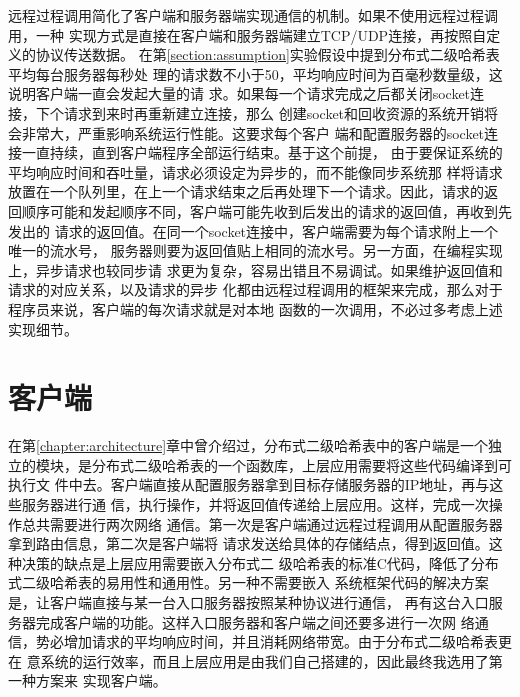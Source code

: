 远程过程调用简化了客户端和服务器端实现通信的机制。如果不使用远程过程调用，一种
实现方式是直接在客户端和服务器端建立TCP/UDP连接，再按照自定义的协议传送数据。
在第\ref{section:assumption}实验假设中提到分布式二级哈希表平均每台服务器每秒处
理的请求数不小于50，平均响应时间为百毫秒数量级，这说明客户端一直会发起大量的请
求。如果每一个请求完成之后都关闭socket连接，下个请求到来时再重新建立连接，那么
创建socket和回收资源的系统开销将会非常大，严重影响系统运行性能。这要求每个客户
端和配置服务器的socket连接一直持续，直到客户端程序全部运行结束。基于这个前提，
由于要保证系统的平均响应时间和吞吐量，请求必须设定为异步的，而不能像同步系统那
样将请求放置在一个队列里，在上一个请求结束之后再处理下一个请求。因此，请求的返
回顺序可能和发起顺序不同，客户端可能先收到后发出的请求的返回值，再收到先发出的
请求的返回值。在同一个socket连接中，客户端需要为每个请求附上一个唯一的流水号，
服务器则要为返回值贴上相同的流水号。另一方面，在编程实现上，异步请求也较同步请
求更为复杂，容易出错且不易调试。如果维护返回值和请求的对应关系，以及请求的异步
化都由远程过程调用的框架来完成，那么对于程序员来说，客户端的每次请求就是对本地
函数的一次调用，不必过多考虑上述实现细节。

\section{客户端}\label{section:client}
在第\ref{chapter:architecture}章中曾介绍过，分布式二级哈希表中的客户端是一个独
立的模块，是分布式二级哈希表的一个函数库，上层应用需要将这些代码编译到可执行文
件中去。客户端直接从配置服务器拿到目标存储服务器的IP地址，再与这些服务器进行通
信，执行操作，并将返回值传递给上层应用。这样，完成一次操作总共需要进行两次网络
通信。第一次是客户端通过远程过程调用从配置服务器拿到路由信息，第二次是客户端将
请求发送给具体的存储结点，得到返回值。这种决策的缺点是上层应用需要嵌入分布式二
级哈希表的标准C代码，降低了分布式二级哈希表的易用性和通用性。另一种不需要嵌入
系统框架代码的解决方案是，让客户端直接与某一台入口服务器按照某种协议进行通信，
再有这台入口服务器完成客户端的功能。这样入口服务器和客户端之间还要多进行一次网
络通信，势必增加请求的平均响应时间，并且消耗网络带宽。由于分布式二级哈希表更在
意系统的运行效率，而且上层应用是由我们自己搭建的，因此最终我选用了第一种方案来
实现客户端。

